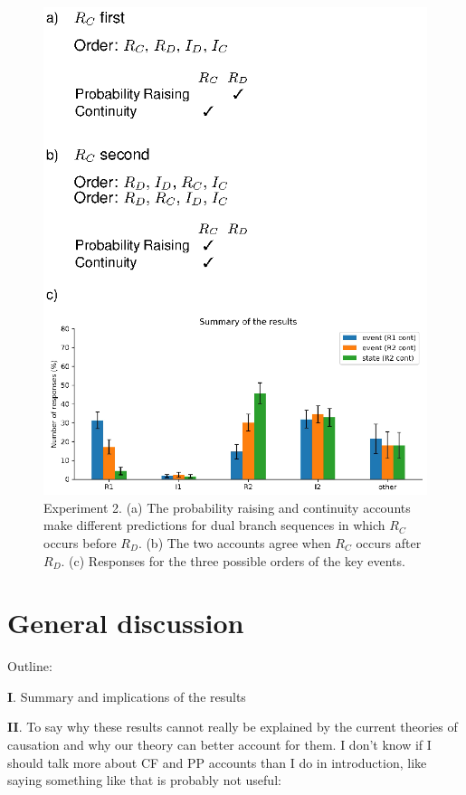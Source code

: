 \documentclass[10pt,letterpaper]{article}
\newcommand{\ev}[2]{$#1_#2$}
\begin{document}
\begin{figure}
\begin{center}
\includegraphics{figures/expt2.eps}
\end{center}
\caption{Experiment 2. (a) The probability raising and continuity accounts make different predictions for dual branch sequences in which \ev{R}{C} occurs before \ev{R}{D}. (b) The two accounts agree when \ev{R}{C} occurs after \ev{R}{D}.
(c) Responses for the three possible orders of the key events.} 
\label{fig:expt2}
\end{figure}

\section{General discussion}

Outline:

\textbf{I}. Summary and implications of the results

\textbf{II}. To say why these results cannot really be explained by the current theories of causation and why our theory can better account for them. I don't know if I should talk more about CF and PP accounts than I do in introduction, like saying something like that is probably not useful:
\end{document}
